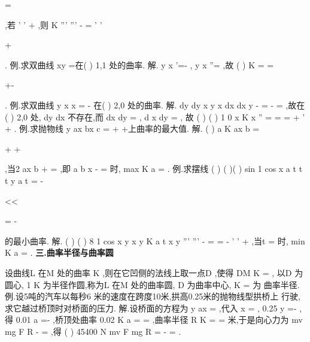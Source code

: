 =

,若
\varphi 
\zeta 
'
'
+
\neq 
,则
K
\varphi \zeta 
\varphi \zeta 
\varphi 
\zeta 
'''
'''
-
=
'
'


+


. 
\textcolor{lyred}{例}.求双曲线
xy =在(
)
1,1 处的曲率. 
解.
y
x
'=-
,
y
x
''=
,故
(
)
K =
=


+-


. 
\textcolor{lyred}{例}.求双曲线
y
x
x
=
-
在(
)
2,0 处的曲率. 
解.
dy
dy
x
y
x
dx
dx
y
-
\cdots 
=
-
\Rightarrow 
=
,故在(
)
2,0 处, dy
dx 不存在,而
dx
dy =
,
d x
dy
=
, 
故
(
)
(
)
1 0
x
K
x
''
=
=
=
+
'
+
. 
\textcolor{lyred}{例}.求抛物线
y
ax
bx
c
=
+
+上曲率的最大值. 
解.
(
)
a
K
ax
b
=


+
+


,当2
ax
b
+
=
,即
a
b
x
-
=
时,
max
K
a
=
. 
\textcolor{lyred}{例}.求摆线
(
)
(
)(
)
sin
1 cos
x
a t
t
t
y
a
t
\pi 
=
-

<<

=
-

的最小曲率. 
解.
(
)
(
)
8 1 cos
x y
x y
K
a
t
x
y
'''
'''
-
=
=
-
'
'
+
,当t
\pi 
=
时,
min
K
a
=
. 
\vspace{4pt}
{\bfseries \textcolor{lyred}{三.曲率半径与曲率圆}}

设曲线L 在M 处的曲率
K \neq 
,则在它凹侧的法线上取一点D ,使得
DM
K
=
, 
以D 为圆心, 1
K 为半径作圆,称为L 在M 处的\textcolor{lyred}{曲率圆}, D 为\textcolor{lyred}{曲率中心},
K
\rho =
为 
\textcolor{lyred}{曲率半径}. 
\textcolor{lyred}{例}.设5吨的汽车以每秒6 米的速度在跨度10米,拱高0.25米的抛物线型拱桥上 
行驶,求它越过桥顶时对桥面的压力. 
解.设桥面的方程为
y
ax
=
,代入
x =
,
0.25
y =-
,得
0.01
a =-
,桥顶处曲率 
0.02
K
a
=
=
,曲率半径
R
K
=
=
米,于是向心力为
mv
mg
F
R
-
=
,得 
(
)
45400 N
mv
F
mg
R
=
-
=
. 